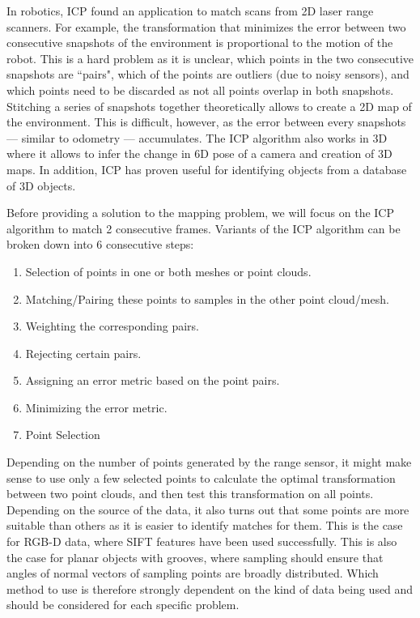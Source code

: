 In robotics, ICP found an application to match scans from 2D laser range scanners. For example, the transformation that minimizes the error between two consecutive snapshots of the environment is proportional to the motion of the robot. This is a hard problem as it is unclear, which points in the two consecutive snapshots are ``pairs", which of the points are outliers (due to noisy sensors), and which points need to be discarded as not all points overlap in both snapshots. Stitching a series of snapshots together theoretically allows to create a 2D map of the environment. This is difficult, however, as the error between every snapshots --- similar to odometry --- accumulates.   The ICP algorithm also works in 3D where it allows to infer the change in 6D pose of a camera and creation of 3D maps. In addition, ICP has proven useful for identifying objects from a database of 3D objects.

Before providing a solution to the mapping problem, we will focus on the ICP algorithm to match 2 consecutive frames. Variants of the ICP algorithm can be broken down into 6 consecutive steps:
\begin{enumerate}
\item Selection of points in one or both meshes or point clouds.
\item Matching/Pairing these points to samples in the other point cloud/mesh.
\item Weighting the corresponding pairs.
\item Rejecting certain pairs.
\item Assigning an error metric based on the point pairs.
\item Minimizing the error metric.
\item Point Selection
\end{enumerate}
Depending on the number of points generated by the range sensor, it might make sense to use only a few selected points to calculate the optimal transformation between two point clouds, and then test this transformation on all points. Depending on the source of the data, it also turns out that some points are more suitable than others as it is easier to identify matches for them. This is the case for RGB-D data, where SIFT features have been used successfully. This is also the case for planar objects with grooves, where sampling should ensure that angles of normal vectors of sampling points are broadly distributed. Which method to use is therefore strongly dependent on the kind of data being used and should be considered for each specific problem.

